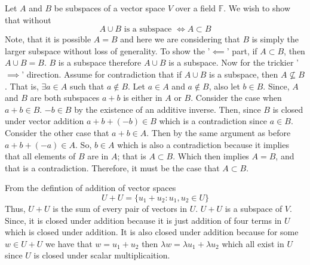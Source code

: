 \documentclass[10pt, twocolumn]{article}
\newcommand{\F}{\mathbb{F}}
\begin{document}
\begin{q}[Problem 12]
    Let $ A $ and $ B $ be subspaces of a vector space $ V $ over a field $ \F $.
    We wish to show that without
    $$ A \cup B \text{ is a subspace } \iff A \subset B $$
    Note, that it is possible $ A = B $ and here we are considering that $ B $ is simply the larger subspace without loss of generality. 
    To show the '$\impliedby$' part, if $ A \subset B $, then $ A \cup B = B $. $ B $ is a subspace therefore $ A \cup B $ is a subspace.
    Now for the trickier '$\implies$' direction.
    Assume for contradiction that if $ A \cup B $ is a subspace, then $ A \not\subseteq B $. 
    That is, $ \exists a \in A $ such that $ a \not\in B $. 
    Let $ a \in A $ and $ a \not\in B $, also let $ b \in B $.  
    Since, $ A $ and $ B $ are both subspaces 
    $ a + b $ is either in $ A $ or $ B $. 
    Consider the case when $ a + b \in B $. 
    $ -b \in B $ by the existence of an additive inverse. 
    Then, since $ B $ is closed under vector addition 
    $ a + b + (-b) \in B $ which is a contradiction since $ a \in B $. 
    Consider the other case that $ a +b \in A $. Then by the same argument as before
    $ a + b + (-a) \in A $. So, $ b \in A $ which is also a contradiction because it implies that all elements of $ B $ are in $ A $; 
    that is $ A \subset B $. Which then implies $ A = B $, and that is a contradiction. 
    Therefore, it must be the case that $ A \subset B $.  
\end{q}
\begin{q}[Problem 15]
    From the defintion of addition of vector spaces 
    $$ U + U = \{u_1 + u_2 : u_1, u_2 \in U\}  $$
    Thus, $ U+ U $ is the sum of every pair of vectors in $ U $. 
    $ U + U $ is a subspace of $ V $. Since, it is closed under addition because it is just addition of four terms in $ U $ which is closed under addition. 
    It is also closed under addition because for some $ w \in U + U $ we have that $ w = u_1 + u_2 $ then $ \lambda w = \lambda u_1 + \lambda u_2 $ which all exist in $ U $ since $ U $ is closed under scalar multiplicaition.
\end{q}
\end{document}
